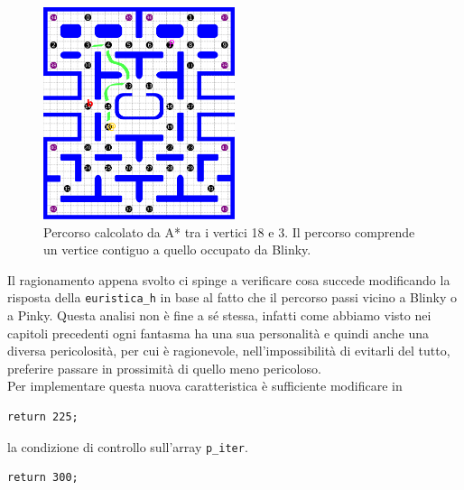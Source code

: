 \documentclass[8pt]{book}
\begin{document}
\begin{figure}
  \centering
  \includegraphics[width=0.5\textwidth]{img/Astar_6.png}
  \caption{Percorso calcolato da A* tra i vertici 18 e 3. Il percorso comprende un vertice contiguo a quello occupato da Blinky.}
  \label{Astar_6}
\end{figure}
 

Il ragionamento appena svolto ci spinge a verificare cosa succede modificando la risposta della \texttt{euristica\_h} in base al fatto che il percorso passi vicino a Blinky o a Pinky. Questa analisi non è fine a sé stessa, infatti come abbiamo visto nei capitoli precedenti ogni fantasma ha una sua personalità e quindi anche una diversa pericolosità, per cui è ragionevole, nell'impossibilità di evitarli del tutto, preferire passare in prossimità di quello meno pericoloso.\\
Per implementare questa nuova caratteristica è sufficiente modificare in

\begin{spacing}{0.9}
  \begin{small}
    \begin{tcolorbox}
\begin{verbatim}
return 225;
\end{verbatim}
  \end{tcolorbox}
    \end{small}
      \end{spacing}

la condizione di controllo sull'array \texttt{p\_iter}.

\begin{spacing}{0.9}
  \begin{small}
    \begin{tcolorbox}
\begin{verbatim}
return 300;
\end{verbatim}
  \end{tcolorbox}
    \end{small}
      \end{spacing}
\end{document}
